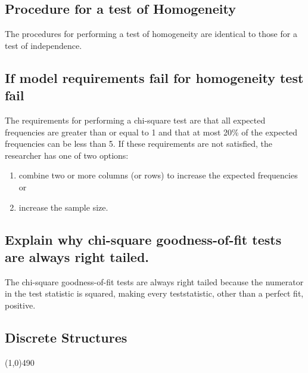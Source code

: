 \documentclass{report}
\begin{document}
        \bigbreak \noindent \bigbreak \noindent 
        \subsection*{Procedure for a test of Homogeneity}
        \bigbreak \noindent 
        The procedures for performing a test of homogeneity are identical to those for a test of independence.

        \bigbreak \noindent \bigbreak \noindent 
        \subsection*{If model requirements fail for homogeneity test fail}
        \bigbreak \noindent 
                The requirements for performing a chi-square test are that all expected frequencies are greater than or equal to 1 and that at most 20\% of the expected frequencies can be less than 5.
        \bigbreak \noindent 
        If these requirements are not satisfied, the researcher has one of two options:
        \begin{enumerate}
            \item combine two or more columns (or rows) to increase the expected frequencies or
            \item increase the sample size.
        \end{enumerate}


        \bigbreak \noindent \bigbreak \noindent 
        \subsection*{Explain why​ chi-square goodness-of-fit tests are always right tailed.}
        \bigbreak \noindent 
        The​ chi-square goodness-of-fit tests are always right tailed because the numerator in the test statistic is​ squared, making every test​ statistic, other than a perfect​ fit, positive.

      \pagebreak 
      \begin{center}
        \section{Discrete Structures}
      \end{center}
      \line(1,0){490}
      \bigbreak \noindent 
\end{document}

